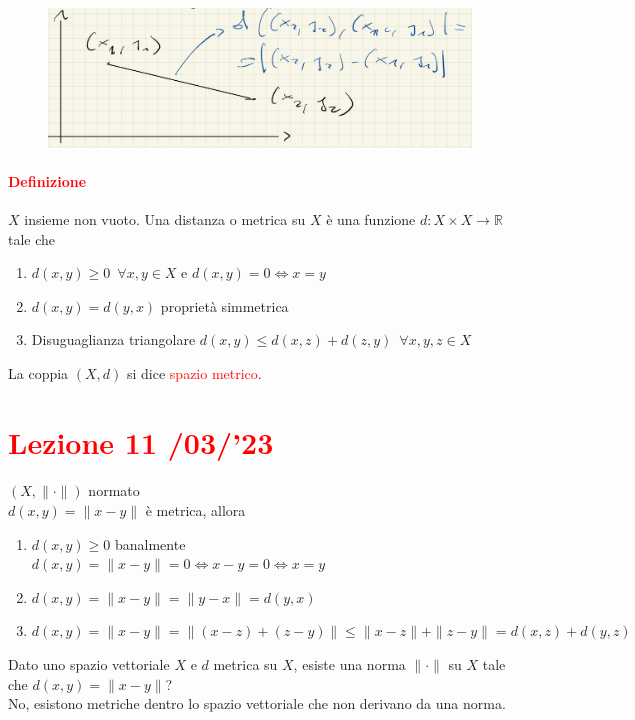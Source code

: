 \documentclass{article}
\newcommand{\R}{\mathbb{R}}
\begin{document}
\begin{figure}[h!]
    \centering
    \includegraphics[width=\textwidth]{Screenshot from 2023-03-22 16-56-15.png}
\end{figure}

\paragraph{\textcolor{red}{Definizione}}
$X$ insieme non vuoto. Una distanza o metrica su $X$ è una funzione $d:X \times X\rightarrow \R$ tale che
\begin{enumerate}
    \item $d(x,y)\geq 0 \,\,\, \forall x,y \in X $ e $d(x,y)=0 \Leftrightarrow x=y$
    \item $d(x,y)=d(y,x)$ proprietà simmetrica
    \item Disuguaglianza triangolare $d(x,y)\leq d(x,z)+d(z,y) \,\,\, \forall x,y,z \in X$
\end{enumerate}
La coppia $(X,d)$ si dice \textcolor{red}{spazio metrico}.


\newpage
\section{\textcolor{red}{Lezione 11 \space{}/03/'23}}
\paragraph{\textcolor{red}{}}
$(X,\parallel\cdot\parallel)$ normato\\
$d(x,y)=\parallel x-y\parallel$ è metrica, allora
\begin{enumerate}
    \item $d(x,y)\geq 0$ banalmente\\
          $d(x,y)=\parallel x-y\parallel =0 \Leftrightarrow x-y=0 \Leftrightarrow x=y$
    \item$d(x,y)= \parallel x-y\parallel=\parallel y-x\parallel =d(y,x)$
    \item $d(x,y)=\parallel x-y\parallel=\parallel(x-z)+(z-y)\parallel\leq \parallel x-z\parallel+\parallel z-y\parallel=d(x,z)+d(y,z)$
\end{enumerate}
Dato uno spazio vettoriale $X$ e $d$ metrica su $X$, esiste una norma $\parallel\cdot\parallel$ su $X$ tale che $d(x,y)=\parallel x-y\parallel$?\\
No, esistono metriche dentro lo spazio vettoriale che non derivano da una norma.
\end{document}
